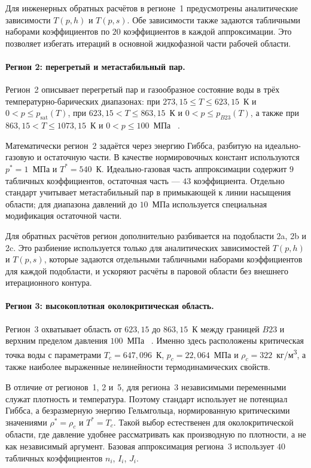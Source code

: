 	Для инженерных обратных расчётов
	в регионе~1 предусмотрены аналитические зависимости
		$T(p, h)$ и $T(p, s)$.
Обе зависимости также задаются табличными наборами коэффициентов
по $20$ коэффициентов в каждой аппроксимации.
Это позволяет избегать итераций
в основной жидкофазной части рабочей области.

\paragraph*{Регион 2: перегретый и метастабильный пар.}
Регион~2 описывает перегретый пар
	и газообразное состояние воды
	в трёх температурно-барических диапазонах:
	при $273{,}15 \le T \le 623{,}15$~К и $0 < p \le p_{\mathrm{sat}}(T)$,
	при $623{,}15 < T \le 863{,}15$~К и $0 < p \le p_{B23}(T)$,
	а также при $863{,}15 < T \le 1073{,}15$~К и $0 < p \le 100$~МПа
	~\cite{iapws_if97_2012}.

	Математически регион~2 задаётся через энергию Гиббса,
	разбитую на идеально-газовую и остаточную части.
	В качестве нормировочных констант
	используются $p^{*}=1$~МПа и $T^{*}=540$~К.
Идеально-газовая часть аппроксимации
содержит $9$ табличных коэффициентов,
остаточная часть --- $43$ коэффициента.
	Отдельно стандарт учитывает метастабильный пар
	в примыкающей к линии насыщения области;
	для диапазона давлений до $10$~МПа
	используется специальная модификация остаточной части.

Для обратных расчётов
регион дополнительно разбивается на подобласти 2a, 2b и 2c.
Это разбиение используется только для аналитических зависимостей
$T(p, h)$ и $T(p, s)$,
которые задаются отдельными табличными наборами коэффициентов
для каждой подобласти,
и ускоряют расчёты в паровой области
без внешнего итерационного контура.

\paragraph*{Регион 3: высокоплотная околокритическая область.}
Регион~3 охватывает область
	от $623{,}15$ до $863{,}15$~К
	между границей $B23$ и верхним пределом давления $100$~МПа
	~\cite{iapws_if97_2012}.
	Именно здесь расположены критическая точка воды
	с параметрами $T_{c}=647{,}096$~К,
	$p_{c}=22{,}064$~МПа
	и $\rho_{c}=322$~кг/м\textsuperscript{3},
	а также наиболее выраженные нелинейности термодинамических свойств.

	В отличие от регионов~1, 2 и~5,
	для региона~3 независимыми переменными служат плотность и температура.
Поэтому стандарт использует не потенциал Гиббса,
а безразмерную энергию Гельмгольца,
нормированную критическими значениями
$\rho^{*}=\rho_{c}$ и $T^{*}=T_{c}$.
Такой выбор естественен для околокритической области,
где давление удобнее рассматривать
как производную по плотности,
а не как независимый аргумент.
	Базовая аппроксимация региона~3
	использует $40$ табличных коэффициентов
	$n_i$, $I_i$, $J_i$.

